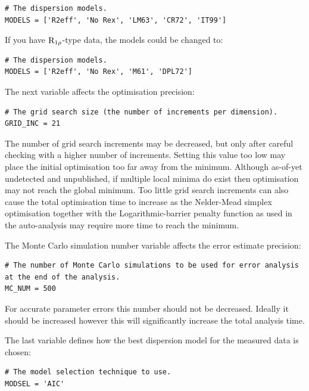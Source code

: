 \begin{lstlisting}[firstnumber=14]
# The dispersion models.
MODELS = ['R2eff', 'No Rex', 'LM63', 'CR72', 'IT99']
\end{lstlisting}

If you have $\mathrm{R}_{1\rho}$-type data, the models could be changed to:

\begin{lstlisting}[numbers=none]
# The dispersion models.
MODELS = ['R2eff', 'No Rex', 'M61', 'DPL72']
\end{lstlisting}

The next variable affects the optimisation precision:

\begin{lstlisting}[firstnumber=17]
# The grid search size (the number of increments per dimension).
GRID_INC = 21
\end{lstlisting}

The number of grid search increments may be decreased, but only after careful checking with a higher number of increments.  Setting this value too low may place the initial optimisation too far away from the minimum.  Although as-of-yet undetected and unpublished, if multiple local minima do exist then optimisation may not reach the global minimum.  Too little grid search increments can also cause the total optimisation time to increase as the Nelder-Mead simplex optimisation together with the Logarithmic-barrier penalty function as used in the auto-analysis may require more time to reach the minimum.

The Monte Carlo simulation number  variable affects the error estimate precision:

\begin{lstlisting}[firstnumber=20]
# The number of Monte Carlo simulations to be used for error analysis at the end of the analysis.
MC_NUM = 500
\end{lstlisting}

For accurate parameter errors this number should not be decreased.  Ideally it should be increased however this will significantly increase the total analysis time.

The last variable defines how the best dispersion model for the measured data is chosen:

\begin{lstlisting}[firstnumber=23]
# The model selection technique to use.
MODSEL = 'AIC'
\end{lstlisting}

